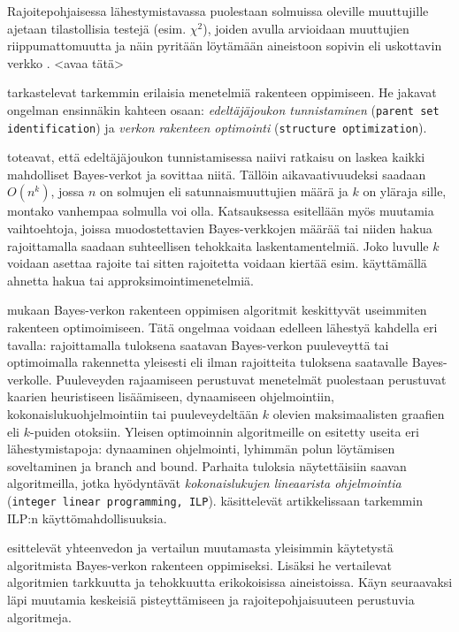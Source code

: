 Rajoitepohjaisessa lähestymistavassa puolestaan solmuissa oleville muuttujille ajetaan tilastollisia testejä (esim. $\chi^2$), joiden avulla arvioidaan muuttujien riippumattomuutta ja näin pyritään löytämään aineistoon sopivin eli uskottavin verkko \citep{ramsahai_connecting_2020, scutari_learning_2010}. <avaa tätä>

 
\citet{scanagatta_survey_2019} tarkastelevat tarkemmin erilaisia menetelmiä rakenteen oppimiseen. He jakavat ongelman ensinnäkin kahteen osaan: \emph{edeltäjäjoukon tunnistaminen} (\texttt{parent set identification}) ja \emph{verkon rakenteen optimointi} (\texttt{structure optimization}). 

\citet{scanagatta_survey_2019} toteavat, että edeltäjäjoukon tunnistamisessa naiivi ratkaisu on laskea kaikki mahdolliset Bayes-verkot ja sovittaa niitä. Tällöin aikavaativuudeksi saadaan $O(n^k)$, jossa $n$ on solmujen eli satunnaismuuttujien määrä ja $k$ on yläraja sille, montako vanhempaa solmulla voi olla. Katsauksessa esitellään myös muutamia vaihtoehtoja, joissa muodostettavien Bayes-verkkojen määrää tai niiden hakua rajoittamalla saadaan suhteellisen tehokkaita laskentamentelmiä. Joko luvulle $k$ voidaan asettaa rajoite tai sitten rajoitetta voidaan kiertää esim. käyttämällä ahnetta hakua tai approksimointimenetelmiä.

\citet{scanagatta_survey_2019} mukaan Bayes-verkon rakenteen oppimisen algoritmit keskittyvät useimmiten rakenteen optimoimiseen. Tätä ongelmaa voidaan edelleen lähestyä kahdella eri tavalla:  rajoittamalla tuloksena saatavan Bayes-verkon puuleveyttä tai optimoimalla rakennetta yleisesti eli ilman rajoitteita tuloksena saatavalle Bayes-verkolle. Puuleveyden rajaamiseen perustuvat menetelmät puolestaan perustuvat kaarien heuristiseen lisäämiseen, dynaamiseen ohjelmointiin, kokonaislukuohjelmointiin tai puuleveydeltään $k$ olevien maksimaalisten graafien eli $k$-puiden otoksiin. Yleisen optimoinnin algoritmeille on esitetty useita eri lähestymistapoja: dynaaminen ohjelmointi, lyhimmän polun löytämisen soveltaminen ja branch and bound. Parhaita tuloksia näytettäisiin saavan algoritmeilla, jotka hyödyntävät \emph{kokonaislukujen lineaarista ohjelmointia} (\texttt{integer linear programming, ILP}). \citet{bartlett_integer_2017} käsittelevät artikkelissaan tarkemmin  ILP:n käyttömahdollisuuksia.

\citet{mittal_review_2011} esittelevät yhteenvedon ja vertailun muutamasta yleisimmin käytetystä algoritmista Bayes-verkon rakenteen oppimiseksi. Lisäksi he vertailevat algoritmien tarkkuutta ja tehokkuutta erikokoisissa aineistoissa. Käyn seuraavaksi läpi muutamia keskeisiä pisteyttämiseen ja rajoitepohjaisuuteen perustuvia algoritmeja.

